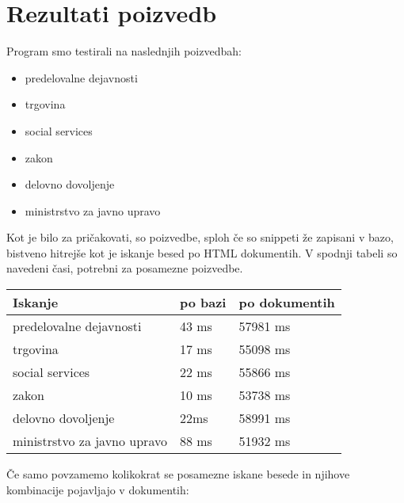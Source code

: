 \documentclass[conference]{IEEEtran}
\begin{document}
	

	
	\section{Rezultati poizvedb}

	Program smo testirali na naslednjih poizvedbah:
	\begin{itemize}
		\item predelovalne dejavnosti
		\item trgovina
		\item social services
		\item zakon
		\item delovno dovoljenje
		\item ministrstvo za javno upravo
	\end{itemize}


	Kot je bilo za pričakovati, so poizvedbe, sploh če so snippeti že zapisani v bazo, bistveno hitrejše kot je iskanje besed po HTML dokumentih. V spodnji tabeli so navedeni časi, potrebni za posamezne poizvedbe.

\begin{flushleft}
\begin{tabular}{ |l|l|l| } 
 \hline
 Iskanje &  po bazi  & po dokumentih    \\
 \hline
 predelovalne dejavnosti &  43 ms & 57981 ms    \\ 
 \hline
 trgovina &  17 ms & 55098 ms  \\  
 \hline
 social services &  22 ms & 55866 ms   \\
 \hline
 zakon &  10 ms & 53738 ms   \\
 \hline
 delovno dovoljenje &  22ms & 58991 ms   \\
 \hline
 ministrstvo za javno upravo &  88 ms & 51932 ms   \\
 \hline
\end{tabular}
\end{flushleft}

	Če samo povzamemo kolikokrat se posamezne iskane besede in njihove kombinacije pojavljajo v dokumentih:
\end{document}
